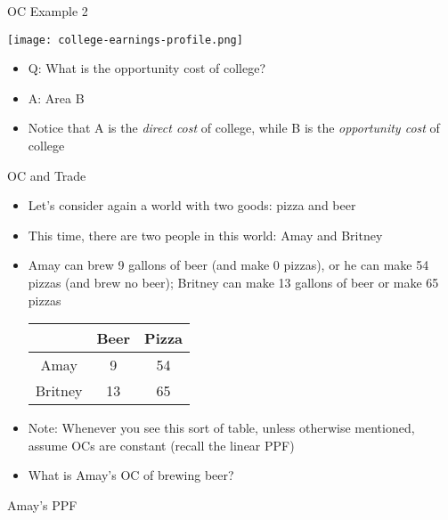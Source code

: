 \documentclass[10pt,xcolor={svgnames}]{beamer}
\begin{document}
\begin{frame}{OC Example 2}
\vspace{-3mm}
\begin{center}
    \texttt{[image: college-earnings-profile.png]}
\end{center}
\vspace{-5mm}
\begin{itemize}[<+>]
    \item Q: What is the opportunity cost of college?
    \item A: Area B
    \item Notice that A is the \textit{direct cost} of college, while B is the \textit{opportunity cost} of college
\end{itemize}
\end{frame}


\begin{frame}{OC and Trade}
\begin{itemize}[<+->]
    \item Let's consider again a world with two goods: pizza and beer
    \item This time, there are two people in this world: Amay and Britney
    \item Amay can brew 9 gallons of beer (and make 0 pizzas), or he can make 54 pizzas (and brew no beer); Britney can make 13 gallons of beer or make 65 pizzas
    \begin{table}[]
        \centering
        \begin{tabular}{c|c|c|} 
            & Beer & Pizza\\
            \hline
            Amay & 9 & 54 \\
            \hline
            Britney & 13 & 65\\
            \hline
        \end{tabular}
    \end{table}
    \item Note: Whenever you see this sort of table, unless otherwise mentioned, assume OCs are constant (recall the linear PPF)
    \item What is Amay's OC of brewing beer?
\end{itemize}
\end{frame}

\begin{frame}{Amay's PPF}

\end{frame}
\end{document}
